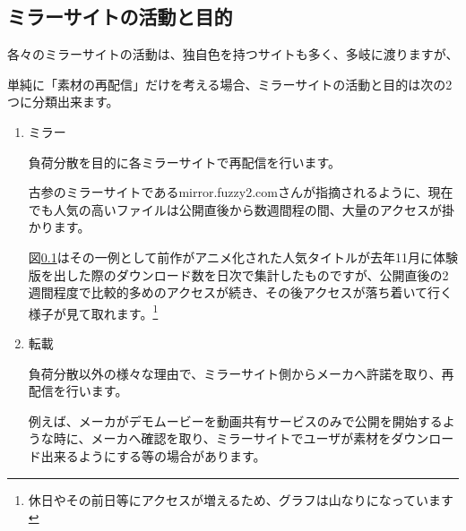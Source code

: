 

 



 

 

 

\subsection{ミラーサイトの活動と目的}

各々のミラーサイトの活動は、独自色を持つサイトも多く、多岐に渡りますが、%

単純に「素材の再配信」だけを考える場合、ミラーサイトの活動と目的は次の2つに分類出来ます。\cite{fuzzy2_2}

\begin{enumerate}

 \item ミラー

  負荷分散を目的に各ミラーサイトで再配信を行います。

  古参のミラーサイトであるmirror.fuzzy2.comさんが指摘されるように、現在でも人気の高いファイルは公開直後から数週間程の間、大量のアクセスが掛かります。\cite{fuzzy2_1}

  図\ref{}はその一例として前作がアニメ化された人気タイトルが去年11月に体験版を出した際のダウンロード数を日次で集計したものですが、公開直後の2週間程度で比較的多めのアクセスが続き、その後アクセスが落ち着いて行く様子が見て取れます。\footnote{休日やその前日等にアクセスが増えるため、グラフは山なりになっています}

 

 \item 転載

  負荷分散以外の様々な理由で、ミラーサイト側からメーカへ許諾を取り、再配信を行います。

  例えば、メーカがデモムービーを動画共有サービスのみで公開を開始するような時に、メーカへ確認を取り、ミラーサイトでユーザが素材をダウンロード出来るようにする等の場合があります。

\end{enumerate}

